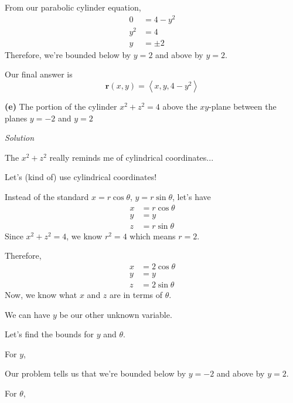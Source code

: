 \documentclass{article}
\newcommand{\lra}[1]{\left\langle #1 \right\rangle}
\renewcommand{\r}[0]{\mathbf{r}}
\newcommand{\Solution}{\textit{Solution}}
\begin{document}
From our parabolic cylinder equation,
\begin{align*}
    0&=4-y^2\\
    y^2&=4\\
    y&=\pm 2
\end{align*}
Therefore, we're bounded below by $y=2$ and above by $y=2$.

Our final answer is
\begin{equation*}
    \boxed{\r(x,y)=\lra{x,y,4-y^2}}\tag{$0\leq x\leq 2$, $-2\leq y\leq 2$}
\end{equation*}

{}\textbf{(e)} The portion of the cylinder $x^2+z^2=4$ above the $xy$-plane between the planes $y=-2$ and $y=2$

\Solution

The $x^2+z^2$ really reminds me of cylindrical coordinates...

Let's (kind of) use cylindrical coordinates!

Instead of the standard $x=r\cos\theta$, $y=r\sin\theta$, let's have
\begin{align*}
    x&=r\cos \theta\\
    y&=y\\
    z&=r\sin \theta
\end{align*}
Since $x^2+z^2=4$, we know $r^2=4$ which means $r=2$.

Therefore,
\begin{align*}
    x&=2\cos\theta\\
    y&=y\\
    z&=2\sin\theta
\end{align*}
Now, we know what $x$ and $z$ are in terms of $\theta$.

We can have $y$ be our other unknown variable.

Let's find the bounds for $y$ and $\theta$.

For $y$,

Our problem tells us that we're bounded below by $y=-2$ and above by $y=2$.

For $\theta$,
\end{document}

